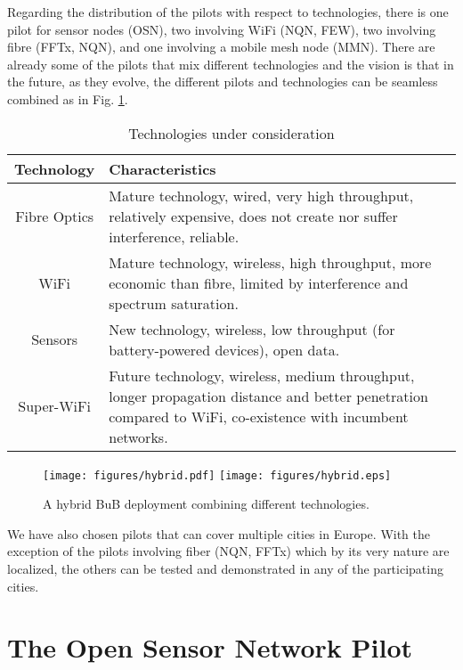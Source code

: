 \documentclass[draftclsnofoot,12pt,journal,onecolumn]{IEEEtran}
\begin{document}
Regarding the distribution of the pilots with respect to technologies, there is one pilot for sensor nodes (OSN), two involving WiFi (NQN, FEW), two involving fibre (FFTx, NQN), and one involving a mobile mesh node (MMN).
There are already some of the pilots that mix different technologies and the vision is that in the future, as they evolve, the different pilots and technologies can be seamless combined as in Fig. \ref{fig:hybrid}.

\begin{table}[!t]
\renewcommand{\arraystretch}{1.3}
\caption{Technologies under consideration \cite{barcelo2012bub} }
\label{tab:technologies}
\centering
\begin{tabular}{|c|p{5cm}|}
\hline
Technology & Characteristics \\
\hline
Fibre Optics & Mature technology, wired, very high throughput, relatively expensive, does not create nor suffer interference, reliable. \\
WiFi & Mature technology, wireless, high throughput, more economic than fibre, limited by interference and spectrum saturation. \\
Sensors & New technology, wireless, low throughput (for battery-powered devices), open data. \\
Super-WiFi & Future technology, wireless, medium throughput, longer propagation distance and better penetration compared to WiFi, co-existence with incumbent networks.\\
\hline
\end{tabular}
\end{table}


\begin{figure}[!t]
\centering
\ifpdf
\texttt{[image: figures/hybrid.pdf]}
\else
\texttt{[image: figures/hybrid.eps]}
\fi
\caption{A hybrid BuB deployment combining different technologies.}
\label{fig:hybrid}
\end{figure}

We have also chosen pilots that can cover multiple cities in Europe.
With the exception of the pilots involving fiber (NQN, FFTx) which by its very nature are localized, the others can be tested and demonstrated in any of the participating cities.

\section{The Open Sensor Network Pilot}
\label{sec:osn}
\end{document}
